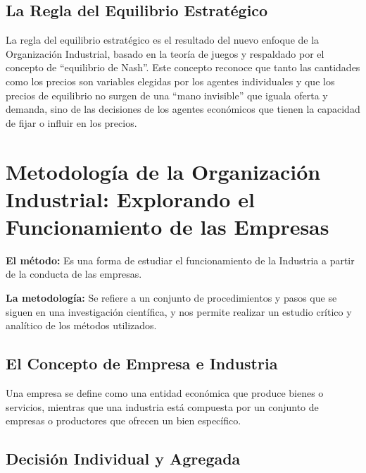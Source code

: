 \documentclass[
  a4paper,
]{article}
\begin{document}
\hypertarget{la-regla-del-equilibrio-estratuxe9gico}{%
\subsection{La Regla del Equilibrio
Estratégico}\label{la-regla-del-equilibrio-estratuxe9gico}}

La regla del equilibrio estratégico es el resultado del nuevo enfoque de
la Organización Industrial, basado en la teoría de juegos y respaldado
por el concepto de ``equilibrio de Nash''. Este concepto reconoce que
tanto las cantidades como los precios son variables elegidas por los
agentes individuales y que los precios de equilibrio no surgen de una
``mano invisible'' que iguala oferta y demanda, sino de las decisiones
de los agentes económicos que tienen la capacidad de fijar o influir en
los precios.

\hypertarget{metodologuxeda-de-la-organizaciuxf3n-industrial-explorando-el-funcionamiento-de-las-empresas}{%
\section{Metodología de la Organización Industrial: Explorando el
Funcionamiento de las
Empresas}\label{metodologuxeda-de-la-organizaciuxf3n-industrial-explorando-el-funcionamiento-de-las-empresas}}

\textbf{El método:} Es una forma de estudiar el funcionamiento de la
Industria a partir de la conducta de las empresas.

\textbf{La metodología:} Se refiere a un conjunto de procedimientos y
pasos que se siguen en una investigación científica, y nos permite
realizar un estudio crítico y analítico de los métodos utilizados.

\hypertarget{el-concepto-de-empresa-e-industria}{%
\subsection{El Concepto de Empresa e
Industria}\label{el-concepto-de-empresa-e-industria}}

Una empresa se define como una entidad económica que produce bienes o
servicios, mientras que una industria está compuesta por un conjunto de
empresas o productores que ofrecen un bien específico.

\hypertarget{decisiuxf3n-individual-y-agregada}{%
\subsection{Decisión Individual y
Agregada}\label{decisiuxf3n-individual-y-agregada}}
\end{document}
